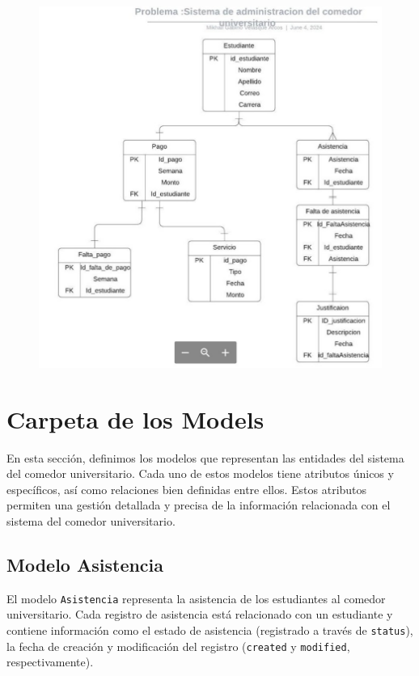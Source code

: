 \documentclass{article}
\begin{document}
\begin{figure}[H]
			\centering
			\includegraphics[scale=0.3]{img/Diagrama_ER_borrador.jpeg} 
		\end{figure}


\section{Carpeta de los Models}

En esta sección, definimos los modelos que representan las entidades del sistema del comedor universitario. Cada uno de estos modelos tiene atributos únicos y específicos, así como relaciones bien definidas entre ellos. Estos atributos permiten una gestión detallada y precisa de la información relacionada con el sistema del comedor universitario.

\subsection{Modelo Asistencia}

El modelo \texttt{Asistencia} representa la asistencia de los estudiantes al comedor universitario. Cada registro de asistencia está relacionado con un estudiante y contiene información como el estado de asistencia (registrado a través de \texttt{status}), la fecha de creación y modificación del registro (\texttt{created} y \texttt{modified}, respectivamente).
\end{document}
